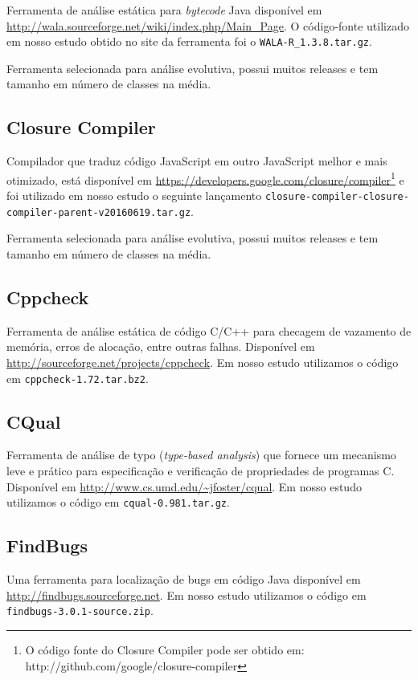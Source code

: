 Ferramenta de análise estática para {\it bytecode} Java disponível em
\url{http://wala.sourceforge.net/wiki/index.php/Main_Page}. O código-fonte
utilizado em nosso estudo obtido no site da ferramenta foi o
\texttt{WALA-R\_1.3.8.tar.gz}.

Ferramenta selecionada para análise evolutiva, possui muitos releases e tem tamanho
em número de classes na média.

\subsection{Closure Compiler}

Compilador que traduz código JavaScript em outro
JavaScript melhor e mais otimizado, está disponível em
\url{https://developers.google.com/closure/compiler}\footnote{O código fonte do
Closure Compiler pode ser obtido em:
http://github.com/google/closure-compiler} e foi utilizado em nosso estudo o
seguinte lançamento
\texttt{closure-compiler-closure-compiler-parent-v20160619.tar.gz}.

Ferramenta selecionada para análise evolutiva, possui muitos releases e tem tamanho
em número de classes na média.

\subsection{Cppcheck}

Ferramenta de análise estática de código C/C++ para checagem de vazamento de
memória, erros de alocação, entre outras falhas. Disponível em
\url{http://sourceforge.net/projects/cppcheck}. Em nosso estudo utilizamos o
código em \texttt{cppcheck-1.72.tar.bz2}.

\subsection{CQual}

Ferramenta de análise de typo ({\it type-based analysis}) que fornece um
mecanismo leve e prático para especificação e verificação de propriedades de
programas C. Disponível em \url{http://www.cs.umd.edu/~jfoster/cqual}. Em
nosso estudo utilizamos o código em \texttt{cqual-0.981.tar.gz}.

\subsection{FindBugs}

Uma ferramenta para localização de bugs em código Java disponível em
\url{http://findbugs.sourceforge.net}. Em nosso estudo utilizamos o código em
\texttt{findbugs-3.0.1-source.zip}.

